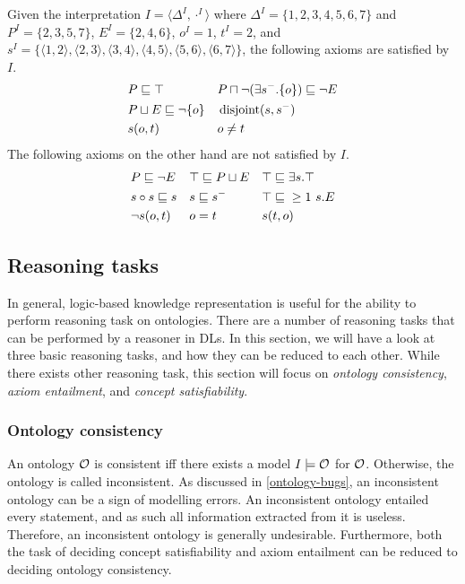 \begin{example}
  Given the interpretation $I = \langle \Delta^I, \cdot^I \rangle$ where $\Delta^I = \{ 1, 2, 3, 4, 5, 6, 7 \}$ and $P^I = \{ 2, 3, 5, 7 \}$, $E^I = \{ 2, 4, 6 \}$, $o^I = 1$, $t^I = 2$, and $s^I = \{ \langle 1, 2 \rangle,\allowbreak \langle 2, 3 \rangle,\allowbreak \langle 3, 4 \rangle,\allowbreak \langle 4, 5 \rangle,\allowbreak \langle 5, 6 \rangle,\allowbreak \langle 6, 7 \rangle \}$, the following axioms are satisfied by $I$.
  \begin{align*}
    &P \sqsubseteq \top &
    &P \sqcap \lnot (\exists s^-.\{o\}) \sqsubseteq \lnot E \\
    &P \sqcup E \sqsubseteq \lnot \{o\} &
    &\operatorname{disjoint}(s, s^-) \\
    &s(o, t) &
    &o \not= t
  \end{align*}
  The following axioms on the other hand are not satisfied by $I$.
  \begin{align*}
    &P \sqsubseteq \lnot E &
    &\top \sqsubseteq P \sqcup E &
    &\top \sqsubseteq \exists s.\top \\
    &s \circ s \sqsubseteq s &
    &s \sqsubseteq s^- &
    &\top \sqsubseteq{} \geq 1~s.E \\
    &\lnot s(o, t) &
    &o = t &
    &s(t, o)
  \end{align*}
\end{example}

\subsection{Reasoning tasks} \label{reasoning-tasks}

In general, logic-based knowledge representation is useful for the ability to perform reasoning task on ontologies. There are a number of reasoning tasks that can be performed by a reasoner in DLs. In this section, we will have a look at three basic reasoning tasks, and how they can be reduced to each other. While there exists other reasoning task, this section will focus on \emph{ontology consistency}, \emph{axiom entailment}, and \emph{concept satisfiability}.

\subsubsection{Ontology consistency} \label{knowledge-base-satisfiability}

An ontology $\mathcal{O}$ is consistent iff there exists a model $I \models \mathcal{O}$ for $\mathcal{O}$. Otherwise, the ontology is called inconsistent. As discussed in \cref{ontology-bugs}, an inconsistent ontology can be a sign of modelling errors. An inconsistent ontology entailed every statement, and as such all information extracted from it is useless. Therefore, an inconsistent ontology is generally undesirable. Furthermore, both the task of deciding concept satisfiability and axiom entailment can be reduced to deciding ontology consistency.

